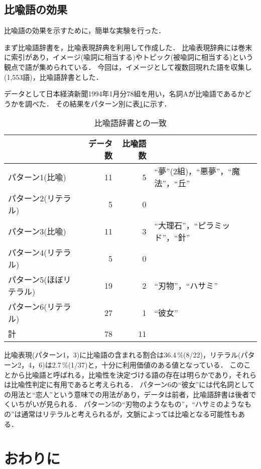 \subsection{比喩語の効果}

比喩語の効果を示すために，簡単な実験を行った．

まず比喩語辞書を，比喩表現辞典\cite{Nakamura-2}を利用して作成した．
比喩表現辞典には巻末に索引があり，イメージ(喩詞に相当する)やトピック(被喩詞に相当する)という観点で語が集められている．
今回は，イメージとして複数回現れた語を収集し(1,553語)，比喩語辞書とした．

データとして日本経済新聞1994年1月分78組を用い，名詞Aが比喩語であるかどうかを調べた．
その結果をパターン別に表\ref{tab:hiyugo}に示す．

\begin{table}[htbp]
	\caption{比喩語辞書との一致}
	\begin{center}
	\begin{tabular}{|l|r|r|l|}
		\hline
		& データ数 & 比喩語数 & \\
		\hline
		\hline
		パターン1(比喩) & 11 & 5 & ``夢''(2組)，``悪夢''，``魔法''，``丘'' \\
		パターン2(リテラル) & 5 & 0 & \\
		パターン3(比喩) & 11 & 3 & ``大理石''，``ピラミッド''，``針'' \\
		パターン4(リテラル) & 5 & 0 & \\
		パターン5(ほぼリテラル) & 19 & 2 & ``刃物''，``ハサミ'' \\
		パターン6(リテラル) & 27 & 1 & ``彼女'' \\
		\hline
		\hline
		計 & 78 & 11 & \\
		\hline
	\end{tabular}
	\end{center}
	\label{tab:hiyugo}
\end{table}

比喩表現(パターン1，3)に比喩語の含まれる割合は36.4\,\%(8/22)，リテラル(パターン2，4，6)は2.7\,\%(1/37)と，十分に利用価値のある値となっている．
このことから比喩語と呼ばれる，比喩性を決定づける語の存在は明らかであり，それらは比喩性判定に有用であると考えられる．
パターン6の``彼女''には代名詞としての用法と``恋人''という意味での用法があり，データは前者，比喩語辞書は後者でくいちがいが見られる．
パターン5の``刃物のようなもの''，``ハサミのようなもの''は通常はリテラルと考えられるが，文脈によっては比喩となる可能性もある．

\section{おわりに}

